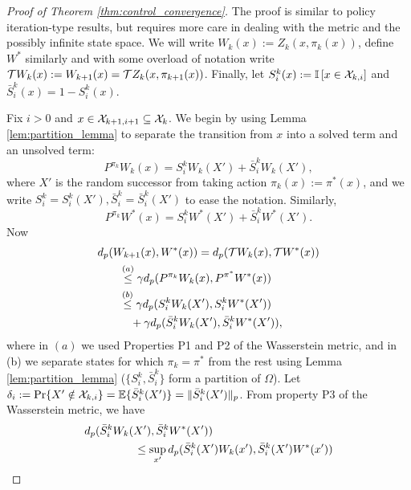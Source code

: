 \documentclass{article}
\begin{document}
\begin{proof}[Proof of Theorem \ref{thm:control_convergence}]
The proof is similar to policy iteration-type results, but requires more care in dealing with the metric and the possibly infinite state space.
We will write $W_k(x) := Z_k(x, \pi_k(x))$, define $W^*$ similarly and with some overload of notation write $\mathcal{T} W_k(x) := W_{k+1}(x) = \mathcal{T} Z_k(x, \pi_{k+1}(x))$.
Finally, let $S^k_i(x) := \mathbb{I}\left [ x \in \mathcal{X}_{k,i} \right ]$ and $\bar S^k_i(x) = 1 - S^k_i(x)$. 

Fix $i > 0$ and $x \in \mathcal{X}_{k+1,i+1} \subseteq \mathcal{X}_k$. We begin by using Lemma \ref{lem:partition_lemma} to separate the transition from $x$ into a solved term and an unsolved term:
\begin{equation*}
P^{\pi_k} W_k(x) = S^k_i W_k(X') + \bar S^k_i W_k(X'),
\end{equation*}
where $X'$ is the random successor from taking action $\pi_k(x) := \pi^*(x)$, and we write $S^k_i = S^k_i(X'), \bar S^k_i = \bar S^k_i(X')$ to ease the notation. Similarly,
\begin{equation*}
P^{\pi_k} W^*(x) = S^k_i W^*(X') + \bar S^k_i W^*(X') .
\end{equation*}
Now
\begin{align}
d_p(W_{k+1}(x), W^*(x)) &= d_p(\cT W_k (x), \cT W^*(x)) \nonumber \\
&\hspace{-7em} \overset{(a)}{\le} \gamma d_p(P^{\pi_k} W_k(x), P^{\pi^*} W^*(x)) \nonumber \\  %
&\hspace{-7em} \overset{(b)}{\le} \gamma d_p( S^k_i W_k(X'), S^k_i W^*(X')) \nonumber \\
&\hspace{-6em} + \gamma d_p (\bar S^k_i W_k(X'), \bar S^k_i W^*(X')), \label{eqn:partition_dp}
\end{align}
where in $(a)$ we used Properties P1 and P2 of the Wasserstein metric, and in (b) we separate states for which $\pi_k = \pi^*$ from the rest using Lemma \ref{lem:partition_lemma} ($\{S^k_i, \bar S^k_i \}$ form a partition of $\Omega$).
Let $\delta_i := \Pr \{ X' \notin \cX_{k,i} \} = \expect \{ \bar S^k_i(X') \} = \pnorm{\bar S_i^k (X')}$.
From property P3 of the Wasserstein metric, we have
\begin{align*}
d_p (\bar S^k_i W_k(X'), \bar S^k_i W^*(X')) &\\
&\hspace{-7em} \le \sup_{x'} d_p(\bar S^k_i (X') W_k(x'), \bar S^k_i (X') W^*(x')) \\

\end{align*}
\end{proof}
\end{document}

